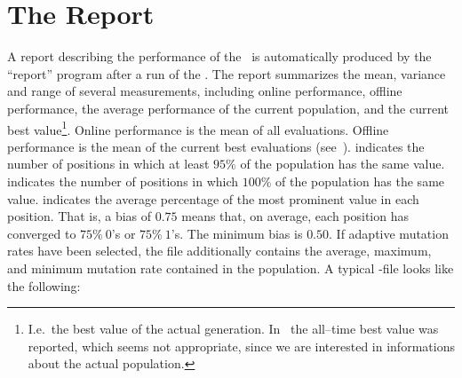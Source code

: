 %
%

\section{The Report}\label{genesis-rep}

A report describing the performance of the \GA\ is automatically
produced by the ``report'' program after a run of the \GA.
The report summarizes the mean,  variance and  range of several 
measurements, including online performance, offline performance, 
the average performance  of  the current population, and the 
current best value\footnote{%
	I.e.~the best value of the actual generation. 
	In \Ogen\ the all--time best value was reported, 
	which seems not appropriate, since we are interested in informations 
	about the actual population.}.  
Online performance is the mean of all  evaluations.   
Offline  performance  is  the  mean  of  the current best evaluations  
(see~\cite{Jon80a}).  
 indicates the number of positions in which at least  $95\%$  of
the  population  has  the  same value.  
 indicates the number of positions in which $100\%$ of the 
population has  the same  value.  
 indicates the average percentage of the most prominent value in 
each position.  
That is, a  bias  of $0.75$  means that, on average, each position has 
converged to $75\%\ 0$'s or $75\%\ 1$'s.  
The minimum bias is $0.50$.
If adaptive mutation rates have been selected, the file additionally contains
the average, maximum, and minimum mutation rate contained in the population.
A typical -file looks like the following:

